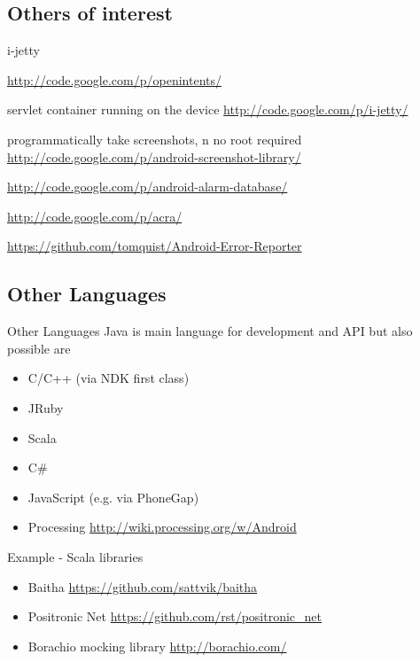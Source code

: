 \documentclass[aspectratio=169]{beamer}
\newcommand{\surl}[1] {{\tiny \url{#1}}}
\begin{document}
  \subsection{Others of interest}  

    \begin{frame}{i-jetty}
      \begin{description}
        \item<4->[OpenIntents] \surl{http://code.google.com/p/openintents/}
        \item<1->[i-jetty] servlet container running on the device \surl{http://code.google.com/p/i-jetty/}
        \item<2->[Android Screenshot library] programmatically take screenshots, n no root required \surl{http://code.google.com/p/android-screenshot-library/}
        \item<3->[Android Alarm Database] \surl{http://code.google.com/p/android-alarm-database/}
        \item<4->[Application Crash Report for Android ACRA] \surl{http://code.google.com/p/acra/}
        \item<5->[Android Error Reporter] \surl{https://github.com/tomquist/Android-Error-Reporter}
      \end{description}
    \end{frame}

  \subsection{Other Languages}
    \begin{frame}{Other Languages}
      Java is main language for development and API but also possible are 
      \begin{itemize}
      \item C/C++ (via NDK first class)
      \item JRuby
      \item Scala
      \item C\#
      \item JavaScript (e.g. via PhoneGap)
      \item Processing \surl{http://wiki.processing.org/w/Android}
      \end{itemize}
    \end{frame}

    \begin{frame}{Example - Scala libraries}
      \begin{itemize}
       \item Baitha \surl{https://github.com/sattvik/baitha}
       \item Positronic Net \surl{https://github.com/rst/positronic_net}
       \item Borachio mocking library \surl{http://borachio.com/}
      \end{itemize}
    \end{frame}
\end{document}
